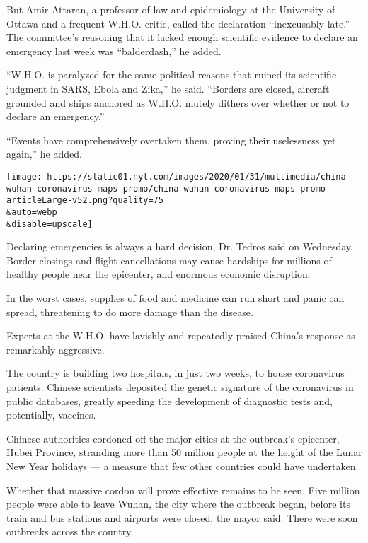 But Amir Attaran, a professor of law and epidemiology at the University
of Ottawa and a frequent W.H.O. critic, called the declaration
``inexcusably late.'' The committee's reasoning that it lacked enough
scientific evidence to declare an emergency last week was
``balderdash,'' he added.

``W.H.O. is paralyzed for the same political reasons that ruined its
scientific judgment in SARS, Ebola and Zika,'' he said. ``Borders are
closed, aircraft grounded and ships anchored as W.H.O. mutely dithers
over whether or not to declare an emergency.''

``Events have comprehensively overtaken them, proving their uselessness
yet again,'' he added.

\texttt{[image: https://static01.nyt.com/images/2020/01/31/multimedia/china-wuhan-coronavirus-maps-promo/china-wuhan-coronavirus-maps-promo-articleLarge-v52.png?quality=75\\\&auto=webp\\\&disable=upscale]}

Declaring emergencies is always a hard decision, Dr. Tedros said on
Wednesday. Border closings and flight cancellations may cause hardships
for millions of healthy people near the epicenter, and enormous economic
disruption.

In the worst cases, supplies of
\href{https://www.businessinsider.com/no-food-crowded-hospitals-wuhan-first-week-in-coronavirus-quarantine-2020-1}{food
and medicine can run short} and panic can spread, threatening to do more
damage than the disease.

Experts at the W.H.O. have lavishly and repeatedly praised China's
response as remarkably aggressive.

The country is building two hospitals, in just two weeks, to house
coronavirus patients. Chinese scientists deposited the genetic signature
of the coronavirus in public databases, greatly speeding the development
of diagnostic tests and, potentially, vaccines.

Chinese authorities cordoned off the major cities at the outbreak's
epicenter, Hubei Province,
\href{https://thehill.com/changing-america/well-being/longevity/479733-more-than-30-million-on-lockdown-amid-coronavirus}{stranding
more than 50 million people} at the height of the Lunar New Year
holidays --- a measure that few other countries could have undertaken.

Whether that massive cordon will prove effective remains to be seen.
Five million people were able to leave Wuhan, the city where the
outbreak began, before its train and bus stations and airports were
closed, the mayor said. There were soon outbreaks across the country.

